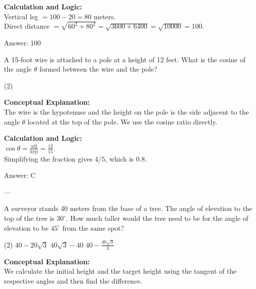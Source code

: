 \documentclass[11pt,paper=a4,answers]{exam}
\begin{document}
\begin{questions}
\begin{solution}
\vspace{10pt}
\textbf{Calculation and Logic:} \\
Vertical leg $= 100 - 20 = 80$ meters. \\
Direct distance $= \sqrt{60^2 + 80^2} = \sqrt{3600 + 6400} = \sqrt{10000} = 100$.

\vspace{15pt}
Answer: \colorbox{yellow!100}{100}
\end{solution}


\question
A 15-foot wire is attached to a pole at a height of 12 feet. What is the cosine of the angle $\theta$ formed between the wire and the pole?
\begin{tasks}(2)
\end{tasks}

\begin{solution}
\textbf{Conceptual Explanation:} \\
The wire is the hypotenuse and the height on the pole is the side adjacent to the angle $\theta$ located at the top of the pole. We use the cosine ratio directly.

\vspace{10pt}
\textbf{Calculation and Logic:} \\
$\cos \theta = \frac{\text{adj}}{\text{hyp}} = \frac{12}{15}$. \\
Simplifying the fraction gives $4/5$, which is 0.8.

\vspace{15pt}
Answer: \colorbox{yellow!100}{C}
\end{solution}

---

\question
A surveyor stands 40 meters from the base of a tree. The angle of elevation to the top of the tree is $30^\circ$. How much taller would the tree need to be for the angle of elevation to be $45^\circ$ from the same spot?
\begin{tasks}(2)
    \task $40 - 20\sqrt{3}$
    \task $40\sqrt{3} - 40$
    \task $40 - \frac{40\sqrt{3}}{3}$
\end{tasks}

\begin{solution}
\textbf{Conceptual Explanation:} \\
We calculate the initial height and the target height using the tangent of the respective angles and then find the difference.


\end{solution}
\end{questions}
\end{document}
